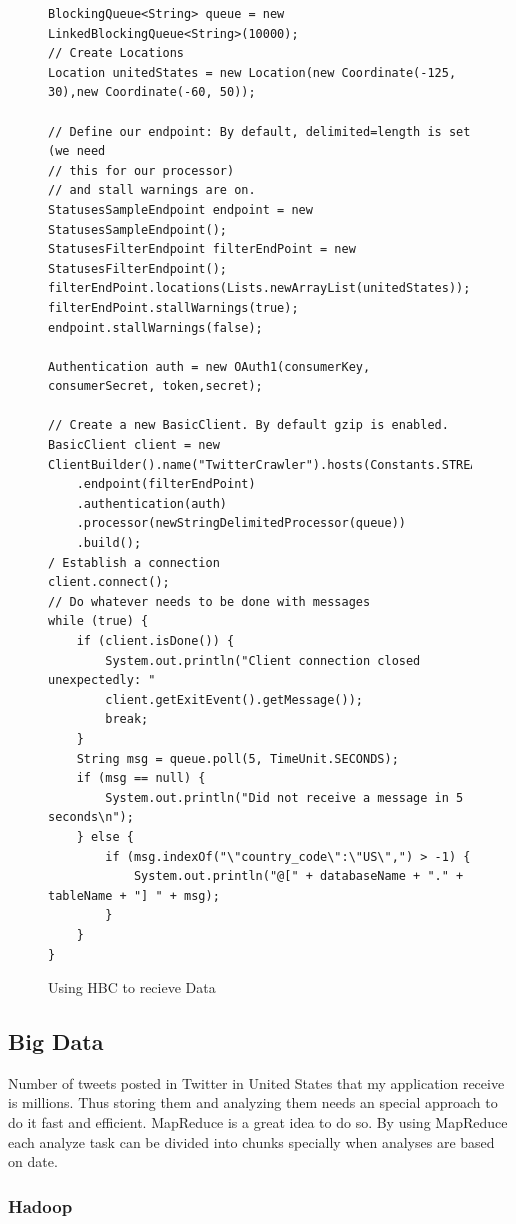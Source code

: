 \documentclass[a4paper,11pt]{report}
\begin{document}
\begin{figure}[!hbp]
\begin{lstlisting}
BlockingQueue<String> queue = new LinkedBlockingQueue<String>(10000);
// Create Locations
Location unitedStates = new Location(new Coordinate(-125, 30),new Coordinate(-60, 50));

// Define our endpoint: By default, delimited=length is set (we need
// this for our processor)
// and stall warnings are on.
StatusesSampleEndpoint endpoint = new StatusesSampleEndpoint();
StatusesFilterEndpoint filterEndPoint = new StatusesFilterEndpoint();
filterEndPoint.locations(Lists.newArrayList(unitedStates));
filterEndPoint.stallWarnings(true);
endpoint.stallWarnings(false);

Authentication auth = new OAuth1(consumerKey, consumerSecret, token,secret);

// Create a new BasicClient. By default gzip is enabled.
BasicClient client = new ClientBuilder().name("TwitterCrawler").hosts(Constants.STREAM_HOST)
	.endpoint(filterEndPoint)
	.authentication(auth)
	.processor(newStringDelimitedProcessor(queue))
	.build();
/ Establish a connection
client.connect();
// Do whatever needs to be done with messages
while (true) {
	if (client.isDone()) {
    	System.out.println("Client connection closed unexpectedly: "
    	client.getExitEvent().getMessage());
    	break;
    }
	String msg = queue.poll(5, TimeUnit.SECONDS);
	if (msg == null) {
		System.out.println("Did not receive a message in 5 seconds\n");
	} else {
		if (msg.indexOf("\"country_code\":\"US\",") > -1) {
			System.out.println("@[" + databaseName + "." + tableName + "] " + msg);
		}
	}
}
\end{lstlisting}
\caption{Using HBC to recieve Data}
\label{fig:hbccode}
\end{figure}

\subsection{Big Data}

Number of tweets posted in Twitter in United States that my application receive is millions. Thus storing them and analyzing them needs an special approach to do it fast and efficient. MapReduce is a great idea to do so. By using MapReduce each analyze task can be divided into chunks specially when analyses are based on date.

\subsubsection{Hadoop}
\end{document}
